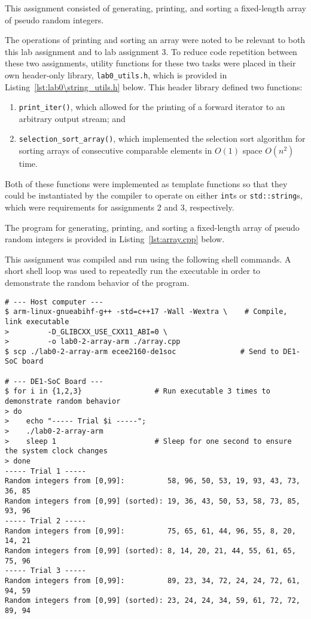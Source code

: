 \documentclass[11pt, letterpaper]{article} %
\begin{document}
This assignment consisted of generating, printing, and sorting a fixed-length array of pseudo random integers. 

The operations of printing and sorting an array were noted to be relevant to both this lab assignment and to lab assignment 3. To reduce code repetition between these two assignments, utility functions for these two tasks were placed in their own header-only library, \texttt{lab0\string_utils.h}, which is provided in Listing~\ref{lst:lab0\string_utils.h} below. This header library defined two functions:
\begin{enumerate}
    \item \texttt{print\string_iter()}, which allowed for the printing of a forward iterator \cite{cplusplus-header-iterator,cppreference-forward-iterator} to an arbitrary output stream; and
    \item \texttt{selection\string_sort\string_array()}, which implemented the selection sort algorithm \cite{wiki:selection-sort} for sorting arrays of consecutive comparable elements in $O(1)$ space $O(n^2)$ time.
\end{enumerate}
Both of these functions were implemented as template functions so that they could be instantiated by the compiler to operate on either \texttt{int}s or \texttt{std::string}s, which were requirements for assignments 2 and 3, respectively.


The program for generating, printing, and sorting a fixed-length array of pseudo random integers is provided in Listing~\ref{lst:array.cpp} below.



This assignment was compiled and run using the following shell commands. A short shell loop was used to repeatedly run the executable in order to demonstrate the random behavior of the program.

\begin{lstlisting}[style=labreportstyle-sh]
# --- Host computer ---
$ arm-linux-gnueabihf-g++ -std=c++17 -Wall -Wextra \    # Compile, link executable
>         -D_GLIBCXX_USE_CXX11_ABI=0 \
>         -o lab0-2-array-arm ./array.cpp
$ scp ./lab0-2-array-arm ecee2160-de1soc               # Send to DE1-SoC board

# --- DE1-SoC Board ---
$ for i in {1,2,3}                 # Run executable 3 times to demonstrate random behavior
> do 
>    echo "----- Trial $i -----";
>    ./lab0-2-array-arm
>    sleep 1                       # Sleep for one second to ensure the system clock changes
> done
----- Trial 1 -----
Random integers from [0,99]:          58, 96, 50, 53, 19, 93, 43, 73, 36, 85
Random integers from [0,99] (sorted): 19, 36, 43, 50, 53, 58, 73, 85, 93, 96
----- Trial 2 -----
Random integers from [0,99]:          75, 65, 61, 44, 96, 55, 8, 20, 14, 21
Random integers from [0,99] (sorted): 8, 14, 20, 21, 44, 55, 61, 65, 75, 96
----- Trial 3 -----
Random integers from [0,99]:          89, 23, 34, 72, 24, 24, 72, 61, 94, 59
Random integers from [0,99] (sorted): 23, 24, 24, 34, 59, 61, 72, 72, 89, 94
\end{lstlisting}
\end{document}
